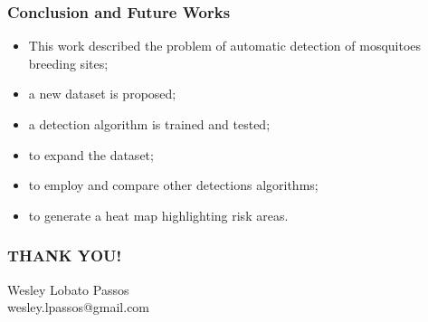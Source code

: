 \documentclass{beamer}
\begin{document}
		\begin{frame}
			\frametitle{Conclusion and Future Works}

		\begin{itemize}
			\item This work described the problem of automatic detection of mosquitoes breeding sites;
			\item a new dataset is proposed;
			\item a detection algorithm is trained and tested;
		\end{itemize}

		\begin{itemize}
			\item to expand the dataset;
			\item to employ and compare other detections algorithms;
			\item to generate a heat map highlighting risk areas.
		\end{itemize}

		\end{frame}


		\begin{frame}
			\frametitle{THANK YOU!}
			\centering
			Wesley Lobato Passos\\
			wesley.lpassos@gmail.com
		\end{frame}
\end{document}
